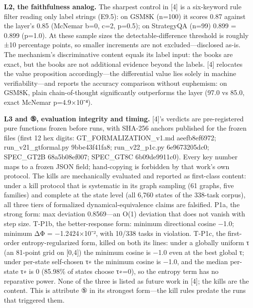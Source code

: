 \documentclass[11pt]{article}
\begin{document}
\noindent \textbf{L2, the faithfulness analog.} The sharpest control in [4] is a six-keyword rule filter reading only label strings (E9.5): on GSM8K (n=100) it scores 0.87 against the layer's 0.85 (McNemar b=0, c=2, p=0.5); on StrategyQA (n=99) 0.899 = 0.899 (p=1.0). At these sample sizes the detectable-difference threshold is roughly ±10 percentage points, so smaller increments are not excluded—disclosed as-is. The mechanism's discriminative content equals its label input: the books are exact, but the books are not additional evidence beyond the labels. [4] relocates the value proposition accordingly—the differential value lies solely in machine verifiability—and reports the accuracy comparison without euphemism: on GSM8K, plain chain-of-thought significantly outperforms the layer (97.0 vs 85.0, exact McNemar p=4.9×10⁻⁴).\par
\noindent \textbf{L3 and ⑤, evaluation integrity and timing.} [4]'s verdicts are pre-registered pure functions frozen before runs, with SHA-256 anchors published for the frozen files (first 12 hex digits: GT\_FORMALIZATION\_v1.md aeefb8ef6972; run\_v21\_gtformal.py 9bbe43f41fa8; run\_v22\_p1c.py 6e9673205dc0; SPEC\_GT2B 68a5b08ef007; SPEC\_GT8C 6b09de9911c0). Every key number maps to a frozen JSON field; hand-copying is forbidden by that work's own protocol. The kills are mechanically evaluated and reported as first-class content: under a kill protocol that is systematic in its graph sampling (61 graphs, five families) and complete at the state level (all 6,760 states of the 338-task corpus), all three tiers of formalized dynamical-equivalence claims are falsified. P1a, the strong form: max deviation 0.8569—an O(1) deviation that does not vanish with step size. T-P1b, the better-response form: minimum directional cosine −1.0; minimum ΔΦ = −1.2424×10⁻², with 10/338 tasks in violation. T-P1c, the first-order entropy-regularized form, killed on both its lines: under a globally uniform τ (an 81-point grid on [0,4]) the minimum cosine is −1.0 even at the best global τ; under per-state self-chosen τ∗ the minimum cosine is −1.0, and the median per-state τ∗ is 0 (85.98\% of states choose τ∗=0), so the entropy term has no reparative power. None of the three is listed as future work in [4]; the kills are the content. This is attribute ⑤ in its strongest form—the kill rules predate the runs that triggered them.\par
\end{document}
